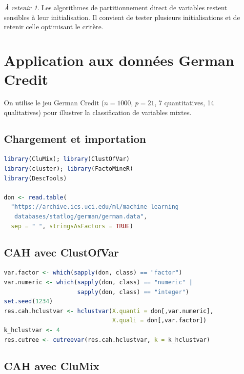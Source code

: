 \documentclass[a4paper,11pt]{article}
\theoremstyle{definition}
\theoremstyle{remark}
\newtheorem*{important}{\`A retenir}
\begin{document}
\begin{important}
  Les algorithmes de partitionnement direct de variables restent
  sensibles \`a leur initialisation. Il convient de tester plusieurs
  initialisations et de retenir celle optimisant le crit\`ere.
\end{important}

\section{Application aux donn\'ees German Credit}

On utilise le jeu German Credit ($n=1000$, $p=21$, 7 quantitatives,
14 qualitatives) pour illustrer la classification de variables
mixtes.

\subsection{Chargement et importation}

\begin{lstlisting}[language=R]
library(CluMix); library(ClustOfVar)
library(cluster); library(FactoMineR)
library(DescTools)

don <- read.table(
  "https://archive.ics.uci.edu/ml/machine-learning-
   databases/statlog/german/german.data",
  sep = " ", stringsAsFactors = TRUE)
\end{lstlisting}

\subsection{CAH avec ClustOfVar}

\begin{lstlisting}[language=R]
var.factor <- which(sapply(don, class) == "factor")
var.numeric <- which(sapply(don, class) == "numeric" |
                     sapply(don, class) == "integer")
set.seed(1234)
res.cah.hclustvar <- hclustvar(X.quanti = don[,var.numeric],
                               X.quali = don[,var.factor])
k_hclustvar <- 4
res.cutree <- cutreevar(res.cah.hclustvar, k = k_hclustvar)
\end{lstlisting}

\subsection{CAH avec CluMix}
\end{document}
